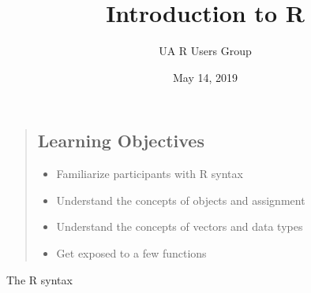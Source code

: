 \documentclass[
  11pt,
  ignorenonframetext,
]{beamer}
\title{Introduction to R}
\author{UA R Users Group}
\date{May 14, 2019}
\providecommand{\tightlist}{%
  \setlength{\itemsep}{0pt}\setlength{\parskip}{0pt}}
\begin{document}
\frame{\titlepage}

\begin{frame}

\begin{quote}
\hypertarget{learning-objectives}{%
\subsection{Learning Objectives}\label{learning-objectives}}

\begin{itemize}
\tightlist
\item
  Familiarize participants with R syntax
\item
  Understand the concepts of objects and assignment
\item
  Understand the concepts of vectors and data types
\item
  Get exposed to a few functions
\end{itemize}
\end{quote}

\end{frame}

\begin{frame}{The R syntax}
\protect\hypertarget{the-r-syntax}{}

\end{frame}
\end{document}
